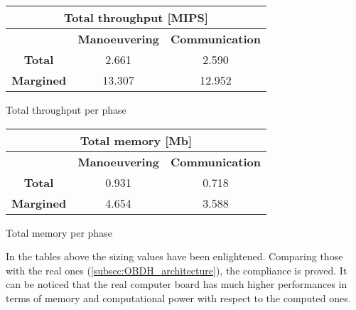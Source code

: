 \vspace*{5mm}
\begin{minipage}{0.5\linewidth}
    \centering
    \cfs{\widthtab}
    \captionsetup{type=table}
    \renewcommand{\arraystretch}{1.4}
    \begin{tabular}{|c|c|c|}
        \hline
        \multicolumn{3}{|c|}{\cellcolor{bluePoli!25}\textbf{Total throughput [MIPS]}} \\
        \hline
        \hline
        & \textbf{Manoeuvering} & \textbf{Communication} \\
        \hline
        \textbf{Total} & 2.661 & 2.590 \\
        \hline
        \textbf{Margined} & \cellcolor{yellow!50}13.307 & 12.952 \\
        \hline
    \end{tabular}
    \caption{Total throughput per phase}
    \label{table:tot_throughput}
\end{minipage}\hfill
\begin{minipage}{0.5\linewidth}
    \centering
    \cfs{\widthtab}
    \captionsetup{type=table}
    \renewcommand{\arraystretch}{1.4}
    \begin{tabular}{|c|c|c|}
        \hline
        \multicolumn{3}{|c|}{\cellcolor{bluePoli!25}\textbf{Total memory [Mb]}} \\
        \hline
        \hline
        & \textbf{Manoeuvering} & \textbf{Communication} \\
        \hline
        \textbf{Total} & 0.931 & 0.718 \\
        \hline
        \textbf{Margined} & \cellcolor{yellow!50}4.654 & 3.588 \\
        \hline
    \end{tabular}
    \caption{Total memory per phase}
    \label{table:tot_memory}
\end{minipage}
\vspace*{5mm}

In the tables above the sizing values have been enlightened.
Comparing those with the real ones (\autoref{subsec:OBDH_architecture}), the compliance is proved.
It can be noticed that the real computer board has much higher performances in terms of memory and computational power with respect to the computed ones.